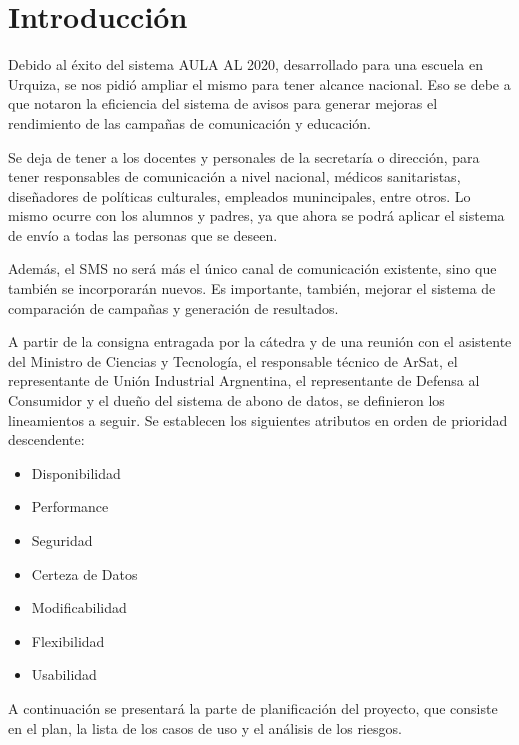 \documentclass[a4paper, 11pt]{article}
\begin{document}
\pagestyle{myheadings}
\maketitle

\thispagestyle{empty}
\tableofcontents

\newpage

\section{Introducción}
Debido al éxito del sistema AULA AL 2020, desarrollado para una escuela en Urquiza, se nos pidió ampliar el mismo para tener alcance nacional. Eso se debe a que notaron la eficiencia del sistema de avisos para generar mejoras el rendimiento de las campañas de comunicación y educación.

Se deja de tener a los docentes y personales de la secretaría o dirección, para tener responsables de comunicación a nivel nacional, médicos sanitaristas, diseñadores de políticas culturales, empleados munincipales, entre otros. Lo mismo ocurre con los alumnos y padres, ya que ahora se podrá aplicar el sistema de envío a todas las personas que se deseen.

Además, el SMS no será más el único canal de comunicación existente, sino que también se incorporarán nuevos. Es importante, también, mejorar el sistema de comparación de campañas y generación de resultados. 

A partir de la consigna entragada por la cátedra y de una reunión con el asistente del Ministro de Ciencias y Tecnología, el responsable técnico de ArSat, el representante de Unión Industrial Argnentina, el representante de Defensa al Consumidor y el dueño del sistema de abono de datos, se definieron los lineamientos a seguir. Se establecen los siguientes atributos en orden de prioridad descendente: 
\begin{itemize}
\item Disponibilidad
\item Performance
\item Seguridad
\item Certeza de Datos
\item Modificabilidad
\item Flexibilidad
\item Usabilidad
\end{itemize}

A continuación se presentará la parte de planificación del proyecto, que consiste en el plan, la lista de los casos de uso y el análisis de los riesgos.  
\end{document}

